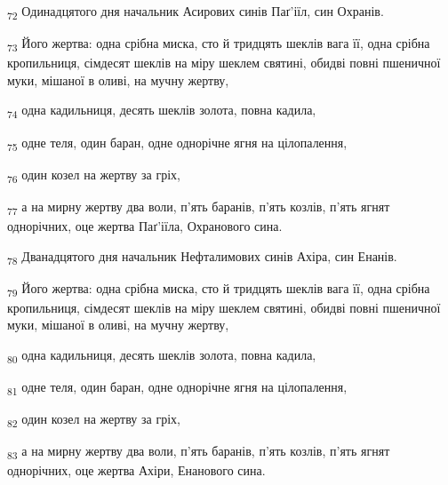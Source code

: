\begin{tcolorbox}
\textsubscript{72} Одинадцятого дня начальник Асирових синів Паґ'іїл, син Охранів.
\end{tcolorbox}
\begin{tcolorbox}
\textsubscript{73} Його жертва: одна срібна миска, сто й тридцять шеклів вага її, одна срібна кропильниця, сімдесят шеклів на міру шеклем святині, обидві повні пшеничної муки, мішаної в оливі, на мучну жертву,
\end{tcolorbox}
\begin{tcolorbox}
\textsubscript{74} одна кадильниця, десять шеклів золота, повна кадила,
\end{tcolorbox}
\begin{tcolorbox}
\textsubscript{75} одне теля, один баран, одне однорічне ягня на цілопалення,
\end{tcolorbox}
\begin{tcolorbox}
\textsubscript{76} один козел на жертву за гріх,
\end{tcolorbox}
\begin{tcolorbox}
\textsubscript{77} а на мирну жертву два воли, п'ять баранів, п'ять козлів, п'ять ягнят однорічних, оце жертва Паґ'іїла, Охранового сина.
\end{tcolorbox}
\begin{tcolorbox}
\textsubscript{78} Дванадцятого дня начальник Нефталимових синів Ахіра, син Енанів.
\end{tcolorbox}
\begin{tcolorbox}
\textsubscript{79} Його жертва: одна срібна миска, сто й тридцять шеклів вага її, одна срібна кропильниця, сімдесят шеклів на міру шеклем святині, обидві повні пшеничної муки, мішаної в оливі, на мучну жертву,
\end{tcolorbox}
\begin{tcolorbox}
\textsubscript{80} одна кадильниця, десять шеклів золота, повна кадила,
\end{tcolorbox}
\begin{tcolorbox}
\textsubscript{81} одне теля, один баран, одне однорічне ягня на цілопалення,
\end{tcolorbox}
\begin{tcolorbox}
\textsubscript{82} один козел на жертву за гріх,
\end{tcolorbox}
\begin{tcolorbox}
\textsubscript{83} а на мирну жертву два воли, п'ять баранів, п'ять козлів, п'ять ягнят однорічних, оце жертва Ахіри, Енанового сина.
\end{tcolorbox}
